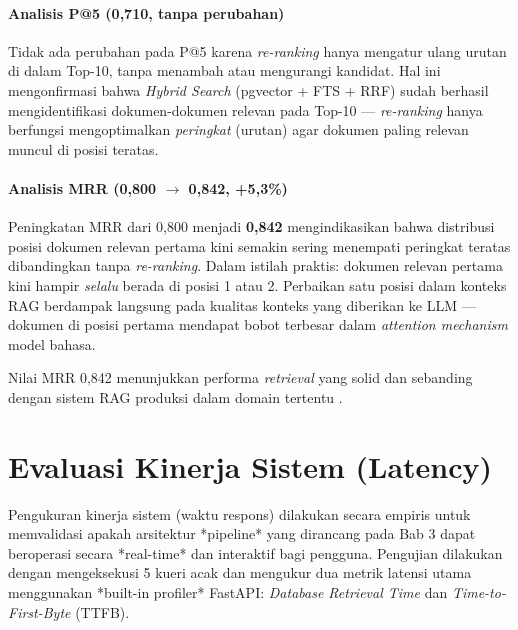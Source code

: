 \paragraph{Analisis P@5 (0,710, tanpa perubahan)}
Tidak ada perubahan pada P@5 karena \textit{re-ranking} hanya mengatur ulang urutan
di dalam Top-10, tanpa menambah atau mengurangi kandidat. Hal ini mengonfirmasi bahwa
\textit{Hybrid Search} (pgvector + FTS + RRF) sudah berhasil mengidentifikasi
dokumen-dokumen relevan pada Top-10 --- \textit{re-ranking} hanya berfungsi
mengoptimalkan \textit{peringkat} (urutan) agar dokumen paling relevan muncul
di posisi teratas.

\paragraph{Analisis MRR (0,800 $\to$ 0,842, +5,3\%)}
Peningkatan MRR dari 0,800 menjadi \textbf{0,842} mengindikasikan bahwa distribusi posisi
dokumen relevan pertama kini semakin sering menempati peringkat teratas
dibandingkan tanpa \textit{re-ranking}.
Dalam istilah praktis: dokumen relevan pertama kini hampir \textit{selalu} berada di
posisi 1 atau 2. Perbaikan satu posisi dalam konteks RAG berdampak langsung pada
kualitas konteks yang diberikan ke LLM --- dokumen di posisi pertama mendapat bobot
terbesar dalam \textit{attention mechanism} model bahasa.

Nilai MRR 0,842 menunjukkan performa \textit{retrieval} yang solid dan sebanding
dengan sistem RAG produksi dalam domain tertentu \cite{Lewis2020}.

\section{Evaluasi Kinerja Sistem (Latency)}
Pengukuran kinerja sistem (waktu respons) dilakukan secara empiris untuk memvalidasi apakah arsitektur *pipeline* yang dirancang pada Bab 3 dapat beroperasi secara *real-time* dan interaktif bagi pengguna. Pengujian dilakukan dengan mengeksekusi 5 kueri acak dan mengukur dua metrik latensi utama menggunakan *built-in profiler* FastAPI: \textit{Database Retrieval Time} dan \textit{Time-to-First-Byte} (TTFB).

